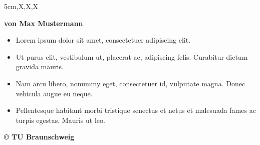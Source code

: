 \documentclass[a2paper,style=scifi,table,parskip=full]{tubsposter}
\begin{document}
  \begin{tubsposter}[sender=bottom]{5cm,X,X,X}
  \showtubslogo[right]
  \begin{posterrow}[bgcolor=tubsLightGray]
    \vfill
    \bfseries\large von Max Mustermann
  \end{posterrow}
  \begin{posterrow}[X,X]
    \begin{postercol}
      \lipsum[2]
    \end{postercol}
    \begin{postercol}
      \itshape\centering\lipsum[3]
    \end{postercol}
  \end{posterrow}
  \begin{posterrow}[28cm,X]
    \begin{postercol}
      \begin{itemize}
        \item Lorem ipsum dolor sit amet, consectetuer adipiscing elit.
        \item Ut purus elit, vestibulum ut, placerat ac, adipiscing felis.
          Curabitur dictum gravida mauris.
        \item Nam arcu libero, nonummy eget, consectetuer id, vulputate magna.
          Donec vehicula augue eu neque.
        \item Pellentesque habitant morbi tristique
          senectus et netus et malesuada fames ac turpis egestas.
          Mauris ut leo. 
      \end{itemize}
    \end{postercol}
    \begin{postercol}[bgimage=infozentrum]
    \end{postercol}
  \end{posterrow}
  \begin{modrow}[fgcolor=tubsBlueDark]
    \lipsum[4]\par\lipsum[5]
    \vfill
    \bfseries\raggedleft\copyright{} TU Braunschweig
  \end{modrow}
  \end{tubsposter}
\end{document}
